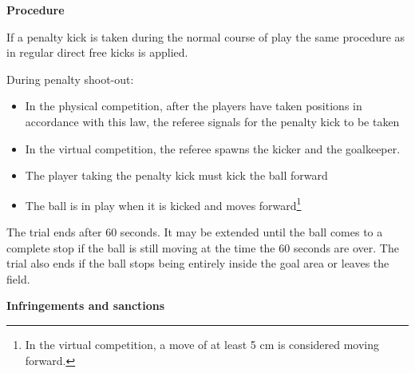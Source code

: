 \bigskip

{\bfseries Procedure}

\headlinebox

If a penalty kick is taken during the normal course of play the same procedure
as in regular direct free kicks is applied.

\bigskip
During penalty shoot-out:

\begin{itemize}
\item In the physical competition, after the players have taken positions in accordance with this law,
    the referee signals for the penalty kick to be taken
\item In the virtual competition, the referee spawns the kicker and the goalkeeper.
\item The player taking the penalty kick must kick the ball forward
\item The ball is in play when it is kicked and moves forward\footnote{In the virtual competition, a move of at least 5 cm is considered moving forward.}
\end{itemize}


\bigskip

The trial ends after 60 seconds.
It may be extended until the ball comes to a complete stop if the ball is still
moving at the time the 60 seconds are over.
The trial also ends if the ball stops being entirely inside the goal area or
leaves the field.

\bigskip


{\bfseries Infringements and sanctions }

\headlinebox


